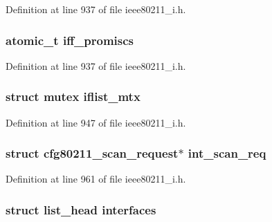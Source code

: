 Definition at line 937 of file ieee80211\-\_\-i.\-h.

\hypertarget{structieee80211__local_a8f1cf23044f197295b99eb923325e33b}{
\subsubsection[{iff\-\_\-promiscs}]{\setlength{\rightskip}{0pt plus 5cm}atomic\-\_\-t iff\-\_\-promiscs}}\label{structieee80211__local_a8f1cf23044f197295b99eb923325e33b}


Definition at line 937 of file ieee80211\-\_\-i.\-h.

\hypertarget{structieee80211__local_a64a494bea7f67ad34d7e3e06f47519fa}{
\subsubsection[{iflist\-\_\-mtx}]{\setlength{\rightskip}{0pt plus 5cm}struct mutex iflist\-\_\-mtx}}\label{structieee80211__local_a64a494bea7f67ad34d7e3e06f47519fa}


Definition at line 947 of file ieee80211\-\_\-i.\-h.

\hypertarget{structieee80211__local_a8468ec1a7c0d94fbdc5cb8c1e030051e}{
\subsubsection[{int\-\_\-scan\-\_\-req}]{\setlength{\rightskip}{0pt plus 5cm}struct cfg80211\-\_\-scan\-\_\-request$\ast$ int\-\_\-scan\-\_\-req}}\label{structieee80211__local_a8468ec1a7c0d94fbdc5cb8c1e030051e}


Definition at line 961 of file ieee80211\-\_\-i.\-h.

\hypertarget{structieee80211__local_af269ec693ad97d77fcfb0decd1c9edc7}{
\subsubsection[{interfaces}]{\setlength{\rightskip}{0pt plus 5cm}struct list\-\_\-head interfaces}}\label{structieee80211__local_af269ec693ad97d77fcfb0decd1c9edc7}


